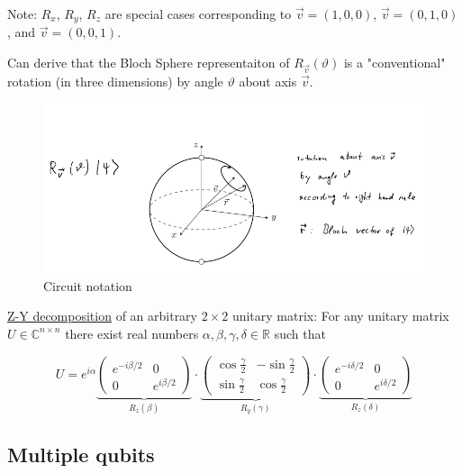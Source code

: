 Note: $R_x$, $R_y$, $R_z$ are special cases corresponding to $\vec{v} = (1, 0, 0)$, 
$\vec{v} = (0, 1, 0)$, and $\vec{v} = (0, 0, 1)$. \newline 

Can derive that the Bloch Sphere representaiton of $R_{\vec{v}}(\vartheta)$ 
is a "conventional" rotation (in three dimensions) by angle $\vartheta$ about 
axis $\vec{v}$.

\begin{figure}[h]
    \centering
    \includegraphics[scale=0.5]{chapters/res/bloch-sphere-rotation.png}
    \caption{Circuit notation}
\end{figure}


\underline{Z-Y decomposition} of an arbitrary $2 \times 2$ unitary matrix: \newline
For any unitary matrix $U \in \mathbb{C}^{n \times n}$ there exist real numbers
$\alpha, \beta, \gamma, \delta \in \mathbb{R}$ such that

\begin{equation}
    U = e^{i \alpha} \underbrace{\begin{pmatrix}
        e^{-i \beta / 2} & 0 \\
        0 & e^{i \beta / 2} 
    \end{pmatrix}}_{R_z(\beta)} \cdot 
    \underbrace{\begin{pmatrix}
        \cos{\frac{\gamma}{2}} & -\sin{\frac{\gamma}{2}} \\
        \sin{\frac{\gamma}{2}} & \cos{\frac{\gamma}{2}}
    \end{pmatrix}}_{R_y(\gamma)} \cdot 
    \underbrace{\begin{pmatrix}
        e^{-i \delta / 2} & 0 \\
        0 & e^{i \delta / 2} 
    \end{pmatrix}}_{R_z(\delta)}
\end{equation}

\subsection{Multiple qubits}

